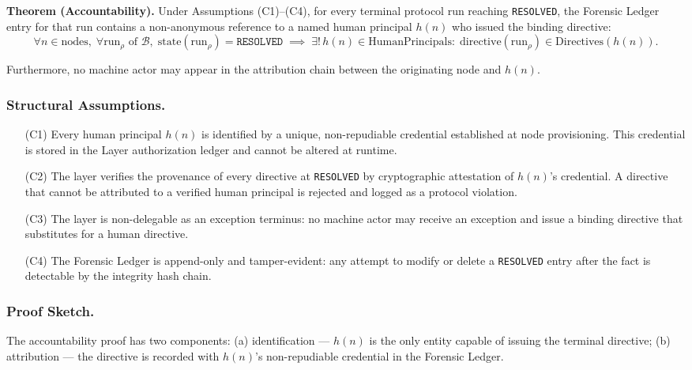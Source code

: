 \begin{bluebox}
\textbf{Theorem (Accountability).} Under Assumptions (C1)--(C4), for every terminal protocol run reaching \texttt{RESOLVED}, the Forensic Ledger entry for that run contains a non-anonymous reference to a named human principal $h(n)$ who issued the binding directive:
\[
\forall n \in \text{nodes},\; \forall \text{run}_\rho \text{ of } \mathcal{B},\;
\text{state}(\text{run}_\rho) = \texttt{RESOLVED} \; \implies \;
\exists!\, h(n) \in \text{HumanPrincipals}:\; \text{directive}(\text{run}_\rho) \in \text{Directives}(h(n)).
\tag{ACCOUNTABILITY}
\]

Furthermore, no machine actor may appear in the attribution chain between the originating node and $h(n)$.
\end{bluebox}

\subsubsection{Structural Assumptions.}

\begin{enumerate}
\item[(C1)] Every human principal $h(n)$ is identified by a unique, non-repudiable credential established at node provisioning. This credential is stored in the \fact{} Layer authorization ledger and cannot be altered at runtime.
\item[(C2)] The \fact{} layer verifies the provenance of every directive at \texttt{RESOLVED} by cryptographic attestation of $h(n)$'s credential. A directive that cannot be attributed to a verified human principal is rejected and logged as a protocol violation.
\item[(C3)] The \purpose{} layer is non-delegable as an exception terminus: no machine actor may receive an exception and issue a binding directive that substitutes for a human directive.
\item[(C4)] The Forensic Ledger is append-only and tamper-evident: any attempt to modify or delete a \texttt{RESOLVED} entry after the fact is detectable by the integrity hash chain.
\end{enumerate}

\subsubsection{Proof Sketch.}

The accountability proof has two components: (a) identification — $h(n)$ is the only entity capable of issuing the terminal directive; (b) attribution — the directive is recorded with $h(n)$'s non-repudiable credential in the Forensic Ledger.

